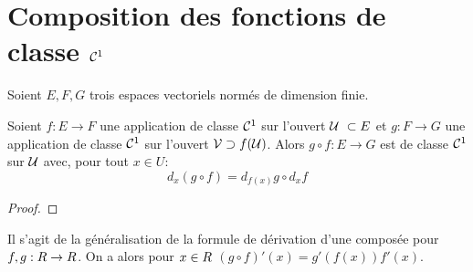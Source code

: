  






\sld{\vfill\pagebreak[5]}%
\section{Composition des fonctions de classe $\mathcal{C}^1$}

	Soient $E,F,G$ trois espaces vectoriels normés de dimension finie.

	\begin{theorem}
Soient $f:E \to F$ une application de classe $\mathcal{C}^1$ sur l'ouvert $\U \subset E$ et $g:F\to G$ une application de classe $\mathcal{C}^1$ sur l'ouvert $\mathcal{V}\supset f(\mathcal{U})$. Alors $g\circ f: E\to G$ est de classe $\mathcal{C}^1$ sur $\mathcal{U}$ avec, pour tout $x\in U$:
	\[
		d_x (g\circ f) = d_{f(x)} g\circ d_x f 
	\]
\end{theorem}

\begin{proof}
	\pl{\rep{10cm}}
\end{proof}

\begin{remark}
	Il s'agit de la généralisation de la formule de dérivation d'une composée pour $f,g:R\to R$. On a alors pour $x\in R$ $(g\circ f)'(x) = g'(f(x)) f'(x)$.
\end{remark}

